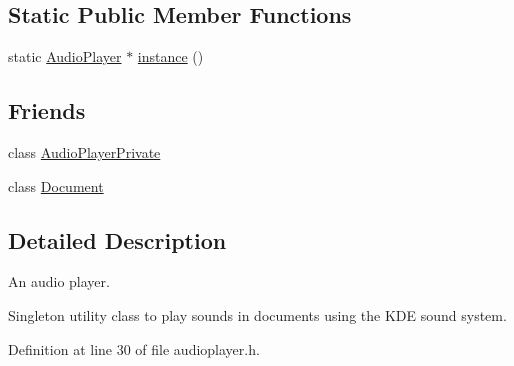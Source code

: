 \subsection*{Static Public Member Functions}
\begin{DoxyCompactItemize}
\item 
static \hyperlink{classOkular_1_1AudioPlayer}{Audio\+Player} $\ast$ \hyperlink{classOkular_1_1AudioPlayer_a5bbc067e81b46451098a2a0becf23e67}{instance} ()
\end{DoxyCompactItemize}
\subsection*{Friends}
\begin{DoxyCompactItemize}
\item 
class \hyperlink{classOkular_1_1AudioPlayer_a3d937a13e5828f806b650af2bfcf72b2}{Audio\+Player\+Private}
\item 
class \hyperlink{classOkular_1_1AudioPlayer_a883538034e58fc5c0de7d4e4cab3cef7}{Document}
\end{DoxyCompactItemize}


\subsection{Detailed Description}
An audio player. 

Singleton utility class to play sounds in documents using the K\+D\+E sound system. 

Definition at line 30 of file audioplayer.\+h.



